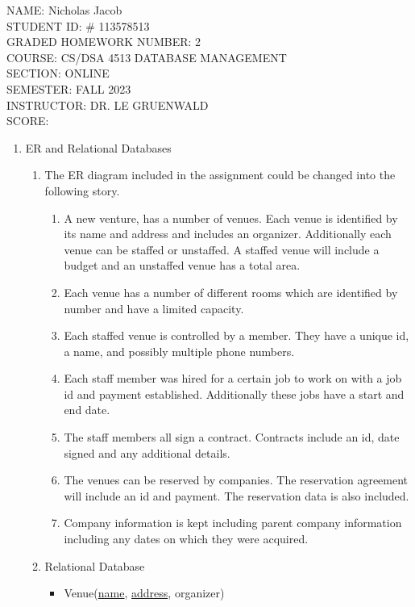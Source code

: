 \documentclass[11pt]{article}
\author{}
\title{}
\begin{document}
{\Large
\noindent NAME:  Nicholas Jacob\\ 
STUDENT ID: \# 113578513\\
GRADED HOMEWORK NUMBER: 2\\
COURSE: CS/DSA 4513 DATABASE MANAGEMENT\\ 
SECTION: ONLINE\\SEMESTER: FALL 2023\\
INSTRUCTOR:  DR. LE GRUENWALD\\
 SCORE:}

\newpage
\begin{enumerate}
\item ER and Relational Databases
\begin{enumerate}
\item The ER diagram included in the assignment could be changed into the following story.
\begin{enumerate}
\item A new venture, has a number of venues.  Each venue is identified by its name and address and includes an organizer.  Additionally each venue can be staffed or unstaffed.  A staffed venue will include a budget and an unstaffed venue has a total area.
\item Each venue has a number of different rooms which are identified by number and have a limited capacity.
\item Each staffed venue is controlled by a member.  They have a unique id, a name, and possibly multiple phone numbers.
\item Each staff member was hired for a certain job to work on with a job id and payment established. Additionally these jobs have a start and end date.
\item The staff members all sign a contract.  Contracts include an id, date signed and any additional details.
\item The venues can be reserved by companies.  The reservation agreement will include an id and payment.  The reservation data is also included.
\item Company information is kept including parent company information including any dates on which they were acquired.
\end{enumerate}
\item Relational Database
\begin{itemize}
\item Venue(\underline {name}, \underline{address}, organizer)


\end{itemize}
\end{enumerate}
\end{enumerate}
\end{document}
